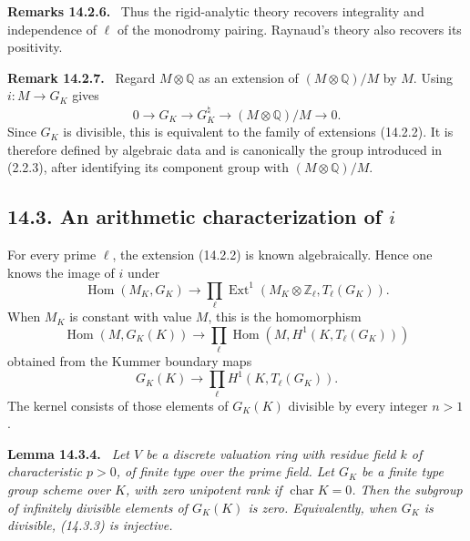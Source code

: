 \documentclass[12pt]{article}
\providecommand{\Hom}{\operatorname{Hom}}
\providecommand{\Ext}{\operatorname{Ext}}
\providecommand{\Z}{\mathbb Z}
\providecommand{\Q}{\mathbb Q}
\providecommand{\car}{\operatorname{char}}
\newenvironment{statement}[1]{\par\medskip\noindent\textbf{#1.}\itshape\ }{\par\medskip}
\newenvironment{remarktext}[1]{\par\medskip\noindent\textbf{#1.}\ }{\par\medskip}
\begin{document}
\begin{remarktext}{Remarks 14.2.6}
Thus the rigid-analytic theory recovers integrality and independence of $\ell$ of the monodromy pairing.  Raynaud's theory also recovers its positivity.
\end{remarktext}

\begin{remarktext}{Remark 14.2.7}
Regard $M\otimes\Q$ as an extension of $(M\otimes\Q)/M$ by $M$.  Using $i:M\to G_K$ gives
\begin{equation}\tag{14.2.8}
        0\longrightarrow G_K\longrightarrow G_K^\natural
        \longrightarrow (M\otimes\Q)/M\longrightarrow0.
\end{equation}
Since $G_K$ is divisible, this is equivalent to the family of extensions (14.2.2).  It is therefore defined by algebraic data and is canonically the group introduced in (2.2.3), after identifying its component group with $(M\otimes\Q)/M$.
\end{remarktext}

\subsection*{14.3. An arithmetic characterization of $i$}

For every prime $\ell$, the extension (14.2.2) is known algebraically.  Hence one knows the image of $i$ under
\begin{equation}\tag{14.3.1}
        \Hom(M_K,G_K)\longrightarrow
        \prod_\ell \Ext^1(M_K\otimes\Z_\ell,T_\ell(G_K)).
\end{equation}
When $M_K$ is constant with value $M$, this is the homomorphism
\begin{equation}\tag{14.3.2}
        \Hom(M,G_K(K))\longrightarrow
        \prod_\ell \Hom(M,H^1(K,T_\ell(G_K)))
\end{equation}
obtained from the Kummer boundary maps
\begin{equation}\tag{14.3.3}
        G_K(K)\longrightarrow\prod_\ell H^1(K,T_\ell(G_K)).
\end{equation}
The kernel consists of those elements of $G_K(K)$ divisible by every integer $n>1$.

\begin{statement}{Lemma 14.3.4}
Let $V$ be a discrete valuation ring with residue field $k$ of characteristic $p>0$, of finite type over the prime field.  Let $G_K$ be a finite type group scheme over $K$, with zero unipotent rank if $\car K=0$.  Then the subgroup of infinitely divisible elements of $G_K(K)$ is zero.  Equivalently, when $G_K$ is divisible, (14.3.3) is injective.
\end{statement}
\end{document}

